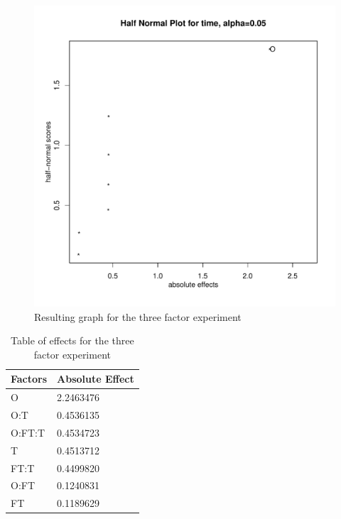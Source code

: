 \documentclass{llncs}
\begin{document}
\begin{figure}
 \includegraphics[width=12cm]{2factorfinal.pdf}
  \caption{Resulting graph for the three factor experiment}\label{3factorGraph}
\end{figure}

\begin{table}
\begin{center}
    \begin{tabular}{ | l l |}
    \hline
    {\bf Factors} & {\bf Absolute Effect}  \\ \hline
	  O     & 2.2463476\\ \hline
	  O:T    &0.4536135 \\ \hline
	  O:FT:T &0.4534723 \\ \hline
	  T      &0.4513712 \\ \hline
	  FT:T   &0.4499820\\ \hline
	  O:FT   &0.1240831 \\ \hline
	  FT     &0.1189629 \\ \hline
    \end{tabular}
\end{center}
\caption{Table of effects for the three factor experiment}\label{3factorEffect}
\end{table}
\end{document}
